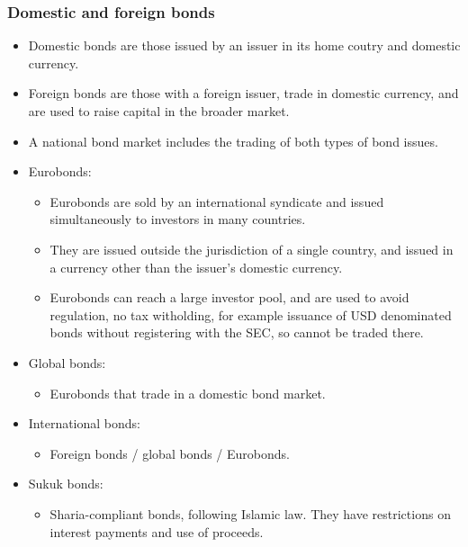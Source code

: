 \documentclass[../notes_compiled.tex]{subfiles}
\begin{document}
\subsubsection{Domestic and foreign bonds}
\begin{itemize}
\item Domestic bonds are those issued by an issuer in its home coutry and domestic currency.
\item Foreign bonds are those with a foreign issuer, trade in domestic currency, and are used to raise capital in the broader market.
\item A national bond market includes the trading of both types of bond issues.
\item Eurobonds:
\begin{itemize}
\item Eurobonds are sold by an international syndicate and issued simultaneously to investors in many countries.
\item They are issued outside the jurisdiction of a single country, and issued in a currency other than the issuer’s domestic currency.
\item Eurobonds can reach a large investor pool, and are used to avoid regulation, no tax witholding, for example  issuance of USD denominated bonds without registering with the SEC, so cannot be traded there.
\end{itemize}
\item Global bonds:
\begin{itemize}
\item Eurobonds that trade in a domestic bond market.
\end{itemize}
\item International bonds:
\begin{itemize}
\item Foreign bonds / global bonds / Eurobonds.
\end{itemize}
\item Sukuk bonds:
\begin{itemize}
\item Sharia-compliant bonds, following Islamic law. They have restrictions on interest payments and use of proceeds.
\end{itemize}
\end{itemize}
\end{document}
